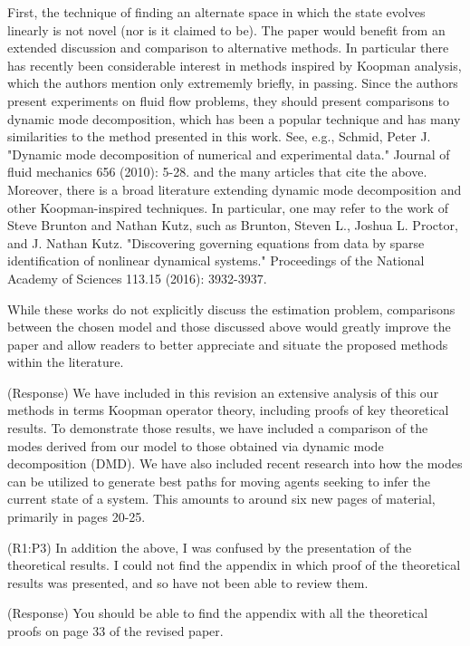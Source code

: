 \documentclass{letter}
\begin{document}
First, the technique of finding an alternate space in which the state
evolves linearly is not novel (nor is it claimed to be). The paper
would benefit from an extended discussion and comparison to alternative
methods. In particular there has recently been considerable interest in
methods inspired by Koopman analysis, which the authors mention only
extrememly briefly, in passing. Since the authors present experiments
on fluid flow problems, they should present comparisons to dynamic mode
decomposition, which has been a popular technique and has many
similarities to the method presented in this work. See, e.g.,
Schmid, Peter J. "Dynamic mode decomposition of numerical and
experimental data." Journal of fluid mechanics 656 (2010): 5-28.
and the many articles that cite the above. Moreover, there is a broad
literature extending dynamic mode decomposition and other
Koopman-inspired techniques. In particular, one may refer to the work
of Steve Brunton and Nathan Kutz, such as 
Brunton, Steven L., Joshua L. Proctor, and J. Nathan Kutz. "Discovering
governing equations from data by sparse identification of nonlinear
dynamical systems." Proceedings of the National Academy of Sciences
113.15 (2016): 3932-3937.

While these works do not explicitly discuss the estimation problem,
comparisons between the chosen model and those discussed above would
greatly improve the paper and allow readers to better appreciate and
situate the proposed methods within the literature. 

{\color{red}(Response)} We have included in this revision an extensive analysis of this our methods in terms Koopman operator theory, including proofs of key theoretical results. To demonstrate those results, we have included a comparison of the modes derived from our model to those obtained via dynamic mode decomposition (DMD). We have also included recent research into how the modes can be utilized to generate best paths for moving agents seeking to infer the current state of a system. This amounts to around six new pages of material, primarily in pages 20-25.

{\color{red}(R1:P3)} In addition the above, I was confused by the presentation of the
theoretical results. I could not find the appendix in which proof of
the theoretical results was presented, and so have not been able to
review them. 

{\color{red}(Response)} You should be able to find the appendix with all the theoretical proofs on page 33 of the revised paper.
\end{document}
